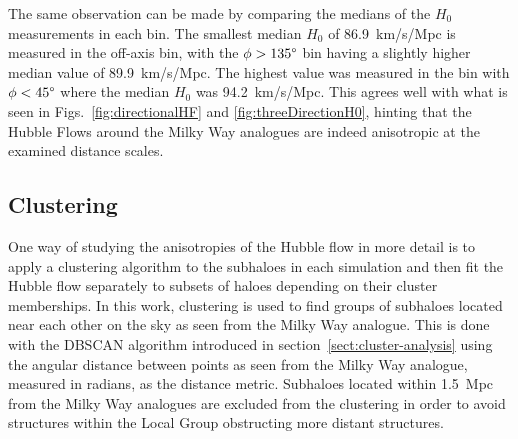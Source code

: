 \documentclass[english, twoside]{HYgradu}
\begin{document}
The same observation can be made by comparing the medians of the $H_0$ measurements in each bin. The smallest median $H_0$ of 86.9~km/s/Mpc is measured in the off-axis bin, with the $\phi > 135\degree$ bin having a slightly higher median value of 89.9~km/s/Mpc. The highest value was measured in the bin with $\phi < 45\degree$ where the median $H_0$ was 94.2~km/s/Mpc. This agrees well with what is seen in Figs.~\ref{fig:directionalHF} and \ref{fig:threeDirectionH0}, hinting that the Hubble Flows around the Milky Way analogues are indeed anisotropic at the examined distance scales.



\subsection{Clustering} \label{sect:clustering}
One way of studying the anisotropies of the Hubble flow in more detail is to apply a clustering algorithm to the subhaloes in each simulation and then fit the Hubble flow separately to subsets of haloes depending on their cluster memberships. In this work, clustering is used to find groups of subhaloes located near each other on the sky as seen from the Milky Way analogue. This is done with the DBSCAN algorithm introduced in section~\ref{sect:cluster-analysis} using the angular distance between points as seen from the Milky Way analogue, measured in radians, as the distance metric. Subhaloes located within 1.5~Mpc from the Milky Way analogues are excluded from the clustering in order to avoid structures within the Local Group obstructing more distant structures.
\end{document}
